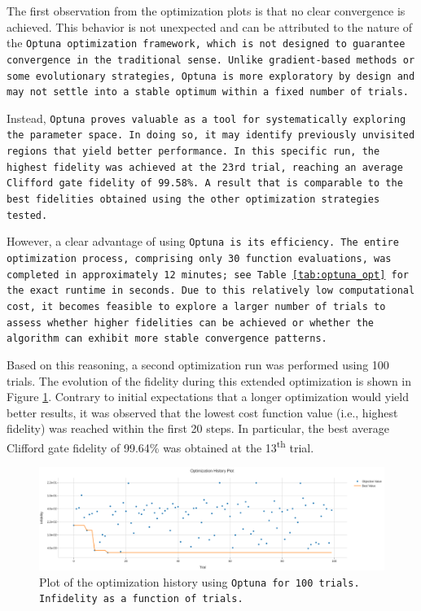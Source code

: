 The first observation from the optimization plots is that no clear convergence is achieved. 
This behavior is not unexpected and can be attributed to the nature of the \tt{Optuna} optimization framework, which is not designed to guarantee convergence in the traditional sense. 
Unlike gradient-based methods or some evolutionary strategies, \tt{Optuna} is more exploratory by design and may not settle into a stable optimum within a fixed number of trials.

Instead, \tt{Optuna} proves valuable as a tool for systematically exploring the parameter space. 
In doing so, it may identify previously unvisited regions that yield better performance. 
In this specific run, the highest fidelity was achieved at the 23rd trial, reaching an average Clifford gate fidelity of 99.58\%. 
A result that is comparable to the best fidelities obtained using the other optimization strategies tested.

However, a clear advantage of using \tt{Optuna} is its efficiency. 
The entire optimization process, comprising only 30 function evaluations, was completed in approximately 12 minutes; see Table \ref{tab:optuna_opt} for the exact runtime in seconds. 
Due to this relatively low computational cost, it becomes feasible to explore a larger number of trials to assess whether higher fidelities can be achieved or whether the algorithm can exhibit more stable convergence patterns.

Based on this reasoning, a second optimization run was performed using 100 trials. 
The evolution of the fidelity during this extended optimization is shown in Figure \ref{fig:optuna100:optimization}. 
Contrary to initial expectations that a longer optimization would yield better results, it was observed that the lowest cost function value (i.e., highest fidelity) was reached within the first 20 steps. 
In particular, the best average Clifford gate fidelity of 99.64\% was obtained at the 13\textsuperscript{th} trial.

\begin{figure}[h!]
    \centering
    \includegraphics[width=\textwidth]{figures/png/RB_optimization/Optuna/100/optimization.png}
    \caption{Plot of the optimization history using \tt{Optuna} for 100 trials. Infidelity as a function of trials.}
    \label{fig:optuna100:optimization}
\end{figure}


